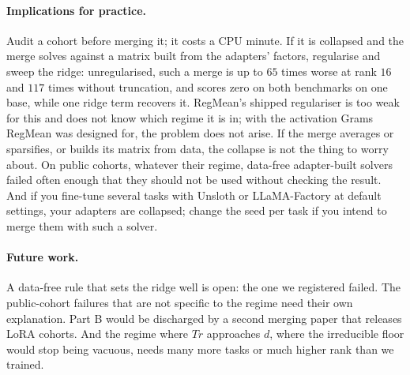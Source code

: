 \paragraph{Implications for practice.} Audit a cohort before merging it; it
costs a CPU minute. If it is collapsed and the merge solves against a matrix
built from the adapters' factors, regularise and sweep the ridge: unregularised,
such a merge is up to $65$ times worse at rank $16$ and $117$ times without
truncation, and scores zero on both benchmarks on one base, while one ridge term
recovers it. RegMean's shipped regulariser is too weak for this and does not
know which regime it is in; with the activation Grams RegMean was designed
for, the problem does not arise. If the merge averages or sparsifies, or
builds its matrix from data, the collapse is not the thing to worry about. On public
cohorts, whatever their regime, data-free adapter-built solvers failed often
enough that they should not be used without checking the result. And if you
fine-tune several tasks with Unsloth or LLaMA-Factory at default settings, your
adapters are collapsed; change the seed per task if you intend to merge them
with such a solver.

\paragraph{Future work.} A data-free rule that sets the ridge well is open:
the one we registered failed. The public-cohort failures that are not specific
to the regime need their own explanation. Part B would be discharged by a
second merging paper that releases LoRA cohorts. And the regime where $Tr$
approaches $d$, where the irreducible floor would stop being vacuous, needs
many more tasks or much higher rank than we trained.
